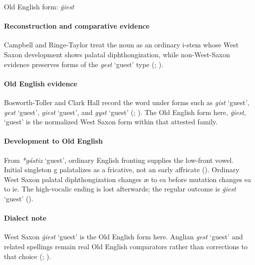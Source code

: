 \documentclass[
  british,
  a4paper,
]{article}
\providecommand{\Recon}[1]{\emph{*#1}}
\begin{document}
Old English form: \emph{ġiest}

\paragraph{Reconstruction and comparative
evidence}\label{reconstruction-and-comparative-evidence-27}

Campbell and Ringe-Taylor treat the noun as an ordinary i-stem whose
West Saxon development shows palatal diphthongization, while
non-West-Saxon evidence preserves forms of the \emph{gest} `guest' type
(;
).

\paragraph{Old English evidence}\label{old-english-evidence-27}

Bosworth-Toller and Clark Hall record the word under forms such as
\emph{gist} `guest', \emph{gest} `guest', \emph{giest} `guest', and
\emph{gyst} `guest' (; ). The Old
English form here, \emph{ġiest}, `guest' is the normalized West Saxon
form within that attested family.

\paragraph{Development to Old
English}\label{development-to-old-english-27}

From \Recon{gástiz} `guest', ordinary English fronting supplies the
low-front vowel. Initial singleton g palatalizes as a fricative, not an
early affricate (). Ordinary
West Saxon palatal diphthongization changes æ to ea before mutation
changes ea to ie. The high-vocalic ending is lost afterwards; the
regular outcome is \emph{ġiest} `guest'
().

\paragraph{Dialect note}\label{dialect-note-1}

West Saxon \emph{ġiest} `guest' is the Old English form here. Anglian
\emph{gest} `guest' and related spellings remain real Old English
comparators rather than corrections to that choice
(;
).
\end{document}
